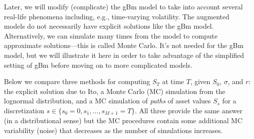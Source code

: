 \documentclass[
]{book}
\begin{document}
Later, we will modify (complicate) the gBm model to take into account several real-life phenomena including, e.g., time-varying volatility. The augmented models do not necessarily have explicit solutions like the gBm model. Alternatively, we can simulate many times from the model to compute approximate solutions---this is called Monte Carlo. It's not needed for the gBm model, but we will illustrate it here in order to take advantage of the simplified setting of gBm before moving on to more complicated models.

Below we compare three methods for computing \(S_T\) at time \(T\), given \(S_0\), \(\sigma\), and \(r\): the explicit solution due to Ito, a Monte Carlo (MC) simulation from the lognormal distribution, and a MC simulation of \emph{paths} of asset values \(S_s\) for a discretization \(s\in \{s_0 = 0, s_1, \ldots, s_{M+1} = T\}\). All three provide the same answer (in a distributional sense) but the MC procedures contain some additional MC variability (noise) that decreases as the number of simulations increases.
\end{document}
